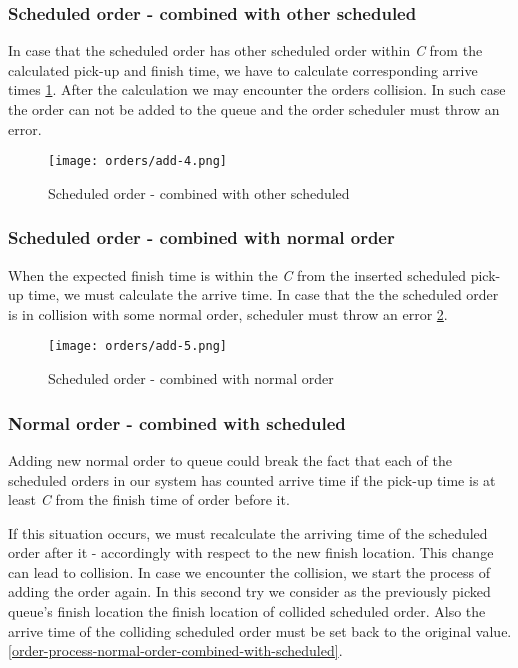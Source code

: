 	
	\subsubsection{Scheduled order - combined with other scheduled}
			In case that the scheduled order has other scheduled order within \textit{C} from the calculated pick-up and finish time, we have to calculate corresponding arrive times \ref{order-process-scheduled-order-combined-with-scheduled}. 
			After the calculation we may encounter the orders collision. In such case the order can not be added to the queue and the order scheduler must throw an error. 
			
			\begin{figure}[h]\centering
				\texttt{[image: orders/add-4.png]}
				\caption{Scheduled order - combined with other scheduled} 
				\label{order-process-scheduled-order-combined-with-scheduled}
			\end{figure} 
		
	\subsubsection{Scheduled order - combined with normal order}
		When the expected finish time is within the \textit{C} from the inserted scheduled pick-up time, we must calculate the arrive time. In case that the the scheduled order is in collision with some normal order, scheduler must throw an error \ref{order-process-scheduled-order-combined-with-normal}.
		 
		\begin{figure}[h]\centering
			\texttt{[image: orders/add-5.png]}
			\caption{Scheduled order - combined with normal order} 
			\label{order-process-scheduled-order-combined-with-normal}
		\end{figure} 
	
			
	\subsubsection{Normal order - combined with scheduled}
	Adding new normal order to queue could break the fact that each of the scheduled orders in our system has counted arrive time if the pick-up time is at least \textit{C} from the finish time of order before it.
	
	If this situation occurs, we must recalculate the arriving time of the scheduled order after it -  accordingly with respect to the new finish location. This change can lead to collision. In case we encounter the collision, we start the process of adding the order again. In this second try we consider as the previously picked queue's finish location the finish location of collided scheduled order. Also the arrive time of the colliding scheduled order must be set back to the original value. 
	 \ref{order-process-normal-order-combined-with-scheduled}.
	
